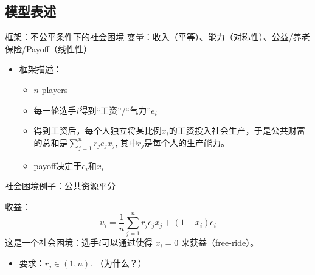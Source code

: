 \documentclass{beamer}
\begin{document}
\subsection{模型表述}
\begin{frame}{框架：不公平条件下的社会困境}
变量：收入（平等）、能力（对称性）、公益/养老保险/Payoff（线性性）\\

\vspace{0.5cm}
\begin{itemize}
    \item<1-> 框架描述：\begin{itemize}
    \item $n$ players
    \item 每一轮选手$i$得到“工资”/“气力”$e_i$
    \item 得到工资后，每个人独立将某比例$x_i$的工资投入社会生产，于是公共财富的总和是$\sum_{j = 1}^n r_j e_j x_j$, 其中$r_j$是每个人的生产能力。
    \item payoff决定于$e_i$和$x_i$
\end{itemize}
\pause
{}
\end{itemize}
\end{frame}

\begin{frame}{社会困境例子：公共资源平分}
\begin{block}{收益：}
    $${u}_{i}=\frac{1}{n}\mathop{\sum }\limits_{j=1}^{n}{r}_{j}{e}_{j}{x}_{j}+(1-{x}_{i}){e}_{i}$$
这是一个社会困境：选手$i$可以通过使得 $x_i=0$ 来获益（free-ride）。
\end{block}

\begin{itemize}
    \item 要求：$r_j\in (1,n)$. （为什么？）
\end{itemize}

\vspace{0.5cm}

\vspace{0.5cm}

\end{frame}
\end{document}
